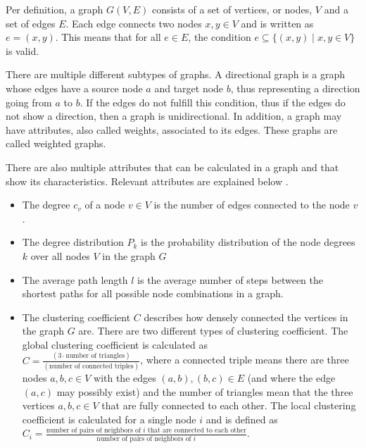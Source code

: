 Per definition, a graph $G(V, E)$ consists of a set of vertices, or nodes, $V$ and a 
set of edges $E$. Each edge connects two nodes $x, y \in V$ and is 
written as $e=(x, y)$. This means that for all $e\in E$, the 
condition  $e \subseteq\{ (x, y) \mid x, y \in V  \}$ 
is valid.

There are multiple different subtypes of graphs. A directional graph is a graph 
whose edges have a source node $a$ and target node $b$, thus representing
a direction going from $a$ to $b$. If the edges do not fulfill this 
condition, thus if the edges do not show a direction, then a graph is unidirectional.
In addition, a graph may have attributes, also called weights, 
associated to its edges. These graphs are called weighted graphs.

There are also multiple attributes that can be calculated in a graph
and that show its characteristics. Relevant attributes are 
explained below \cite{basicnetwork}.
\begin{itemize}
    \item The degree $c_v$ of a node $v \in V$ is the number of edges connected to the
    node $v$. 
    \item The degree distribution $P_k$ is the probability distribution 
    of the node degrees $k$ over all nodes $V$ in the graph $G$
    \item The average path length $l$ is the average number of steps between
    the shortest paths for all possible node combinations in a graph.
    \item The clustering coefficient $C$ describes how densely connected
    the vertices in the graph $G$ are. There are two different types of
    clustering coefficient. The global clustering
    coefficient is calculated as \\
    $C=\frac{(3 \cdot\text{number of triangles})}{(\text{number of connected triples})}$,
    where a connected triple means there are three nodes $a,b,c\in V$ with
    the edges $(a,b), (b,c) \in E$ (and where the edge $(a,c)$ may 
    possibly exist) and the number of triangles mean
    that the three vertices $a,b,c\in V$ that are fully connected to each other.
    The local clustering coefficient is calculated for a single node $i$
    and is defined as $C_i=\frac{\text{number of pairs of neighbors of }i 
    \text{ that are connected to each other}}
    {\text{number of pairs of neighbors of }i }$.
\end{itemize}

